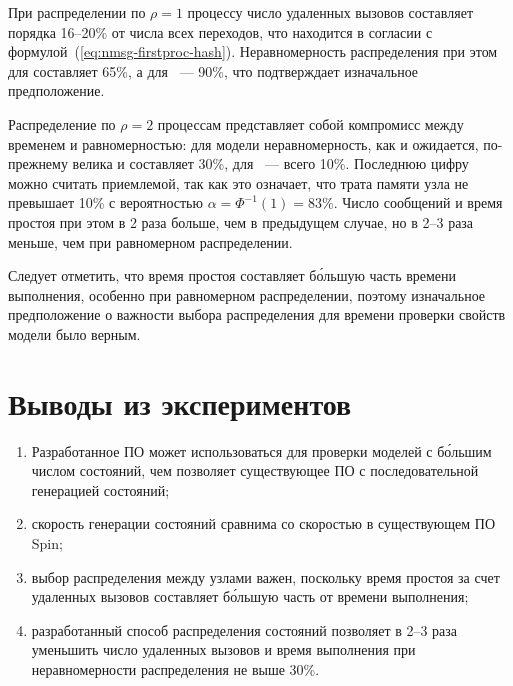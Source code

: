 При распределении по $\rho = 1$ процессу число удаленных вызовов составляет порядка
16--20\% от числа всех переходов, что находится в согласии с
формулой~(\ref{eq:nmsg-firstproc-hash}). Неравномерность распределения при этом для
 составляет 65\%, а для ~--- 90\%, что подтверждает изначальное
предположение.

Распределение по $\rho = 2$ процессам представляет собой компромисс между временем и
равномерностью: для модели  неравномерность, как и ожидается, по-прежнему
велика и составляет 30\%, для ~--- всего 10\%. Последнюю цифру можно
считать приемлемой, так как это означает, что трата памяти узла не превышает 10\% с
вероятностью $\alpha = \Phi^{-1}(1) = 83\%$. Число сообщений и время простоя при этом в 2
раза больше, чем в предыдущем случае, но в 2--3 раза меньше, чем при равномерном
распределении.

Следует отметить, что время простоя составляет б\'{о}льшую часть времени выполнения,
особенно при равномерном распределении, поэтому изначальное предположение о важности
выбора распределения для времени проверки свойств модели было верным.

\section*{Выводы из экспериментов}

\begin{enumerate}
\item Разработанное ПО может использоваться для проверки моделей с б\'{о}льшим числом
  состояний, чем позволяет существующее ПО с последовательной генерацией состояний;
\item скорость генерации состояний сравнима со скоростью в существующем ПО Spin;
\item выбор распределения между узлами важен, поскольку время простоя за счет удаленных
  вызовов составляет б\'{о}льшую часть от времени выполнения;
\item разработанный способ распределения состояний позволяет в 2--3 раза уменьшить число
  удаленных вызовов и время выполнения при неравномерности распределения не выше 30\%.
\end{enumerate}


